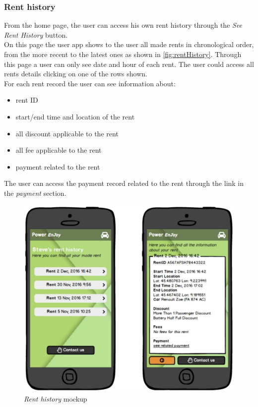 \clearpage

\subsubsection{Rent history}

From the home page, the user can access his own rent history through the \emph{See Rent History} button. \\

On this page the user app shows to the user all made rents in chronological order, from the more recent to the latest ones as shown in \autoref{fig:rentHistory}. Through this page a user can only see date and hour of each rent. The user could access all rents details clicking on one of the rows shown. \\

For each rent record the user can see information about:
\begin{itemize}
	\item rent ID
	\item start/end time and location of the rent
	\item all discount applicable to the rent
	\item all fee applicable to the rent
	\item payment related to the rent
\end{itemize}

The user can access the payment record related to the rent through the link in the \emph{payment} section.
\\

\begin{figure}[h]
			\centering
			\includegraphics[width=0.9\linewidth]{mockups/rentHistory}
			\caption{
				\label{fig:rentHistory} 
				\emph{Rent history} mockup
			}
		\end{figure}

